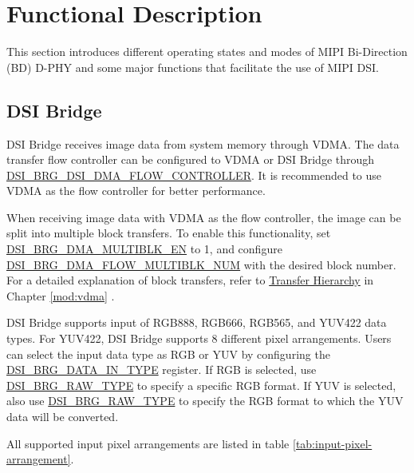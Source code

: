 \documentclass[main\_\_EN.tex]{subfiles}
\begin{document}

\section{Functional Description}
\label{sec:mipidsi-func-descr}
This section introduces different operating states and modes of MIPI Bi-Direction (BD) D-PHY and some major functions that facilitate the use of MIPI DSI.

\subsection{DSI Bridge}
\label{sec:dsi-bridge}

DSI Bridge receives image data from system memory through VDMA. The data transfer flow controller can be configured to VDMA or DSI Bridge through \hyperref[fielddesc:DSIBRGDSIDMAFLOWCONTROLLER]{DSI\_BRG\_DSI\_DMA\_FLOW\_CONTROLLER}. It is recommended to use VDMA as the flow controller for better performance.





When receiving image data with VDMA as the flow controller, the image can be split into multiple block transfers. To enable this functionality, set \hyperref[fielddesc:DSIBRGDMAMULTIBLKEN]{DSI\_BRG\_DMA\_MULTIBLK\_EN} to 1, and configure \hyperref[fielddesc:DSIBRGDMAFLOWMULTIBLKNUM]{DSI\_BRG\_DMA\_FLOW\_MULTIBLK\_NUM} with the desired block number. For a detailed explanation of block transfers, refer to \hyperref[sec:vdma-transfer-hierarchy]{Transfer Hierarchy} in Chapter \ref{mod:vdma} \textit{}.

DSI Bridge supports input of RGB888, RGB666, RGB565, and YUV422 data types. For YUV422, DSI Bridge supports 8 different pixel arrangements. Users can select the input data type as RGB or YUV by configuring the \hyperref[fielddesc:DSIBRGDATAINTYPE]{DSI\_BRG\_DATA\_IN\_TYPE} register. If RGB is selected, use \hyperref[fielddesc:DSIBRGRAWTYPE]{DSI\_BRG\_RAW\_TYPE} to specify a specific RGB format. If YUV is selected, also use \hyperref[fielddesc:DSIBRGRAWTYPE]{DSI\_BRG\_RAW\_TYPE} to specify the RGB format to which the YUV data will be converted.

All supported input pixel arrangements are listed in table \ref{tab:input-pixel-arrangement}.
\end{document}
